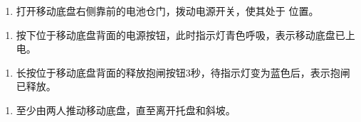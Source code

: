 \documentclass[a4paper,11pt,english,openany,oneside]{sphinxmanual}
\begin{document}
\begin{enumerate}
%
\setcounter{enumi}{3}
\item {} 
\sphinxAtStartPar
打开移动底盘右侧靠前的电池仓门，拨动电源开关，使其处于  位置。
\begin{quote}

\begin{figure}[H]
\centering

\noindent{}
\end{figure}
\end{quote}

\end{enumerate}


\begin{enumerate}
%
\setcounter{enumi}{4}
\item {} 
\sphinxAtStartPar
按下位于移动底盘背面的电源按钮，此时指示灯青色呼吸，表示移动底盘已上电。
\begin{quote}

\begin{figure}[H]
\centering

\noindent{}
\end{figure}
\end{quote}

\end{enumerate}


\begin{enumerate}
%
\setcounter{enumi}{5}
\item {} 
\sphinxAtStartPar
长按位于移动底盘背面的释放抱闸按钮3秒，待指示灯变为蓝色后，表示抱闸已释放。
\begin{quote}

\begin{figure}[H]
\centering

\noindent{}
\end{figure}
\end{quote}

\end{enumerate}


\begin{enumerate}
%
\setcounter{enumi}{6}
\item {} 
\sphinxAtStartPar
至少由两人推动移动底盘，直至离开托盘和斜坡。
\begin{quote}

\begin{figure}[H]
\centering

\noindent{}
\end{figure}
\end{quote}

\end{enumerate}
\end{document}
